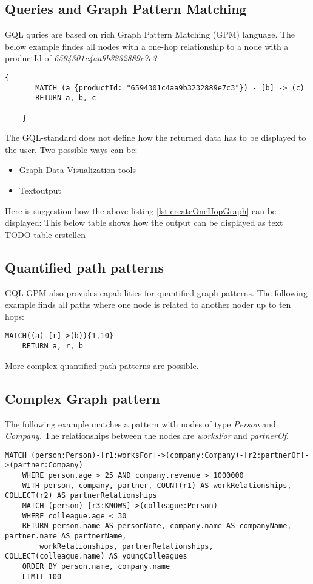 \subsection{Queries and Graph Pattern Matching}
GQL quries are based on rich Graph Pattern Matching (GPM) language.
The below example findes all nodes with a one-hop relationship to a node with a 
productId of \textit{6594301c4aa9b3232889e7c3}
\begin{lstlisting}[caption={Example for one hop graph pattern query}, label={lst:createOneHopGraph}]
    {
       MATCH (a {productId: "6594301c4aa9b3232889e7c3"}) - [b] -> (c)
	   RETURN a, b, c

    }
\end{lstlisting}

The GQL-standard does not define how the returned data has to be displayed
to the user. Two possible ways can be:
\begin{itemize}
	\item Graph Data Visualization tools
	\item Textoutput
\end{itemize}
Here is suggestion how the above listing \ref{lst:createOneHopGraph} can be displayed:
This below table shows how the output can be displayed as text \\
TODO table erstellen



\subsection{Quantified path patterns}
GQL GPM also provides capabilities for quantified graph patterns.
The following example finds all paths where one node is related to another noder
up to ten hops:
\begin{lstlisting}[caption={Example for quantified graph pattern}, label={lst:createQuantifiedGraph}]
    MATCH((a)-[r]->(b)){1,10}
	RETURN a, r, b
\end{lstlisting}
More complex quantified path patterns are possible. 
\subsection{Complex Graph pattern}
The following example matches a pattern
with nodes of type \textit{Person} and \textit{Company}.
The relationships between the nodes are \textit{worksFor} and \textit{partnerOf}.

\begin{lstlisting}[caption={Example for a complex quantified graph pattern (Benchmark)}, label={lst:benchmark}]
    MATCH (person:Person)-[r1:worksFor]->(company:Company)-[r2:partnerOf]->(partner:Company)
	WHERE person.age > 25 AND company.revenue > 1000000
	WITH person, company, partner, COUNT(r1) AS workRelationships, COLLECT(r2) AS partnerRelationships
	MATCH (person)-[r3:KNOWS]->(colleague:Person)
	WHERE colleague.age < 30
	RETURN person.name AS personName, company.name AS companyName, partner.name AS partnerName, 
		workRelationships, partnerRelationships, COLLECT(colleague.name) AS youngColleagues
	ORDER BY person.name, company.name
	LIMIT 100
\end{lstlisting}

